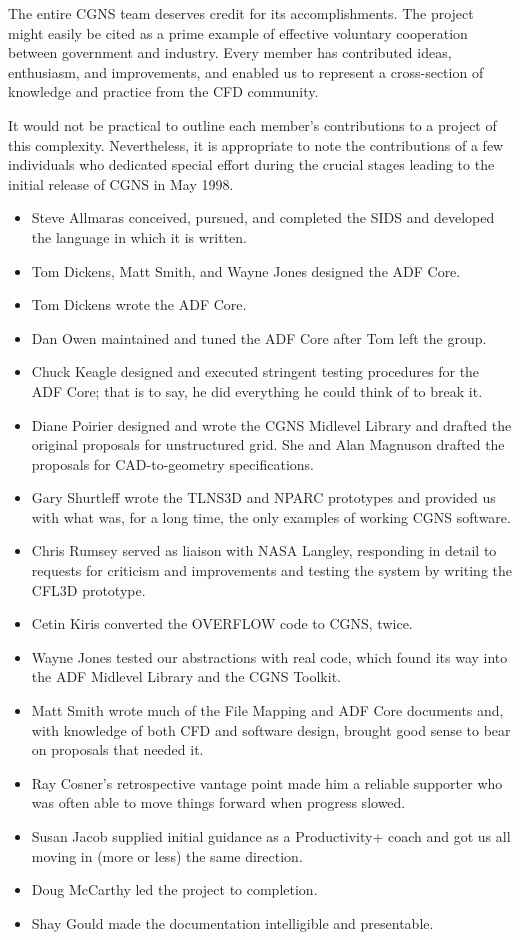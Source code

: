 The entire CGNS team deserves credit for its accomplishments.
The project might easily be cited as a prime example of effective
voluntary cooperation between government and industry.
Every member has contributed ideas, enthusiasm, and improvements, and
enabled us to represent a cross-section of knowledge and practice from
the CFD community.

It would not be practical to outline each member's contributions to a
project of this complexity.
Nevertheless, it is appropriate to note the contributions of a few
individuals who dedicated special effort during the crucial stages
leading to the initial release of CGNS in May 1998.

\begin{itemize}
\item Steve Allmaras conceived, pursued, and completed the SIDS and
      developed the language in which it is written.
\item Tom Dickens, Matt Smith, and Wayne Jones designed the ADF Core.
\item Tom Dickens wrote the ADF Core.
\item Dan Owen maintained and tuned the ADF Core after Tom left the group.
\item Chuck Keagle designed and executed stringent testing procedures
      for the ADF Core; that is to say, he did everything he could think
      of to break it.
\item Diane Poirier designed and wrote the CGNS Midlevel Library and
      drafted the original proposals for unstructured grid.
      She and Alan Magnuson drafted the proposals for CAD-to-geometry
      specifications.
\item Gary Shurtleff wrote the TLNS3D and NPARC prototypes and provided
      us with what was, for a long time, the only examples of working
      CGNS software.
\item Chris Rumsey served as liaison with NASA Langley, responding in
      detail to requests for criticism and improvements and testing the
      system by writing the CFL3D prototype.
\item Cetin Kiris converted the OVERFLOW code to CGNS, twice.
\item Wayne Jones tested our abstractions with real code, which found
      its way into the ADF Midlevel Library and the CGNS Toolkit.
\item Matt Smith wrote much of the File Mapping and ADF Core documents
      and, with knowledge of both CFD and software design, brought good
      sense to bear on proposals that needed it.
\item Ray Cosner's retrospective vantage point made him a reliable
      supporter who was often able to move things forward when progress
      slowed.
\item Susan Jacob supplied initial guidance as a Productivity+ coach and
      got us all moving in (more or less) the same direction.
\item Doug McCarthy led the project to completion.
\item Shay Gould made the documentation intelligible and presentable.
\end{itemize}

